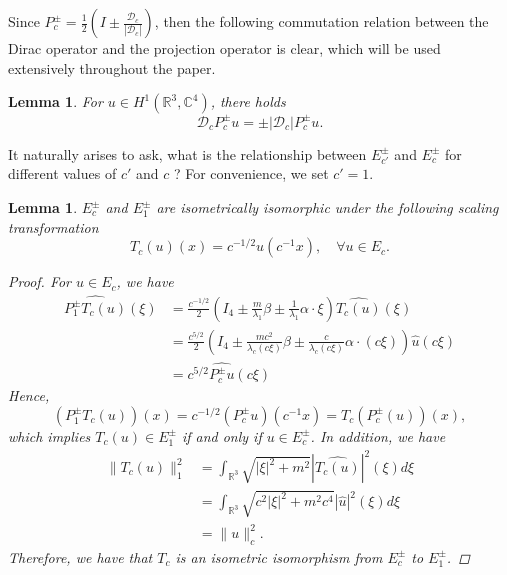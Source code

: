 \documentclass{amsart}
\theoremstyle{plain}
\newtheorem{lemma}[theorem]{Lemma}
\theoremstyle{definition}
\theoremstyle{remark}
\numberwithin{equation}{section} \numberwithin{figure}{section}
\begin{document}
Since $P_c^\pm=\frac{1}{2}\left(I \pm \frac{\mathscr{D}_c}{\left|\mathscr{D}_c\right|}\right)$, then the following commutation relation between the Dirac operator and the projection operator is clear, which will be used extensively throughout the paper.
\begin{lemma}
    For $u\in  H^{1}(\mathbb{R}^3,\mathbb{C}^4)$, there
    holds $$\mathscr{D}_cP_c^\pm u = \pm |\mathscr{D}_c|P_c^\pm u. $$
\end{lemma}


It naturally arises to ask, what is the relationship between \( E_{c'}^\pm \) and \( E_c^\pm \) for different values of \( c' \) and $c $ ? For convenience, we set $c'=1$.
\begin{lemma}\label{scal}
    \( E_c^\pm \) and \( E_1^\pm \) are isometrically isomorphic under the following scaling transformation
    $$  T_c(u)(x)=  c^{-1/2}u(c^{-1}x),\quad \forall u\in E_c.$$
    \begin{proof}

For $u\in E_c$, we have
\begin{equation}
    \begin{split}
        \widehat{P_1^\pm T_c(u)}(\xi)&= 
        \frac{c^{-1/2}}{2}\left(I_4\pm\frac{m}{\lambda_1}\beta\pm\frac{1 }{\lambda_1}\alpha\cdot \xi\right)\widehat{T_c(u)}(\xi)\\
        &= \frac{c^{5/2}}{2}\left(I_4\pm\frac{mc^2}{\lambda_c(c\xi)}\beta\pm\frac{c }{\lambda_c(c\xi)}\alpha\cdot (c\xi)\right)\hat{u}(c\xi)\\
        &={c^{5/2}}\widehat{P_c^\pm u}(c\xi)
    \end{split}
\end{equation}
Hence, 
$$
(P_1^\pm T_c(u))(x) = c^{-1/2}(P_c^\pm u) (c^{-1}x)= T_c(P_c^{\pm}(u))(x),
$$
which implies $T_c(u)\in E_1^\pm$ if and only if $u\in E_c^\pm$. In addition, we have
\begin{equation}
    \begin{split}
        \|T_c(u)\|_1^2 &=\int_{\mathbb{R}^3}\sqrt{|\xi|^2+ m^2}|\widehat{T_c(u)}|^2(\xi) d \xi
        \\
&=\int_{\mathbb{R}^3}\sqrt{c^2|\xi|^2+ m^2c^4}|\widehat{u}|^2(\xi) d \xi\\
        &=\|u\|_c^2.
    \end{split}
\end{equation}
Therefore, we have that \( T_c \) is an isometric isomorphism from \( E_c^\pm \) to \( E_1^\pm \).    
    \end{proof}
\end{lemma}
\end{document}
